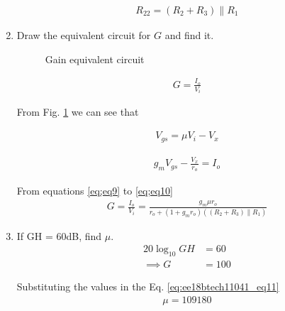 \begin{enumerate}[label=\arabic*.,ref=\theenumi]
\begin{align}
    R_{22} = (R_2+R_3) \parallel R_1
\end{align}

\item Draw the equivalent circuit for $G$ and find it.
\\
\solution 
\begin{figure}[!ht]
	\begin{center}
		\resizebox{\columnwidth}{!}{}
	\end{center}
\caption{Gain equivalent circuit}
\label{fig:ee18btech11041_fig7}
\end{figure}
\begin{align}
    G = \frac{I_o}{V_i} 
    \label{eq;eq8}
\end{align}

From Fig. \ref{fig:ee18btech11041_fig7} we can see that
 
\begin{align}
    V_{gs} = \mu V_i - V_x
    \label{eq;eq9}
\end{align}

\begin{align}
    g_mV_{gs} - \frac{V_x}{r_o} = I_o
    \label{eq;eq10}
\end{align}

From equations \ref{eq;eq9} to \ref{eq;eq10}
\begin{align}
    G = \frac{I_o}{V_i} = \frac{g_m \mu r_o}{r_o + (1+g_m r_o)((R_2+R_3) \parallel R_1) }
    \label{eq:ee18btech11041_eq11}
\end{align}
\item If GH = 60dB, find $\mu$.
\\
\solution 
\begin{align}
    20\log_{10} GH &= 60 
    \label{eq:ee18btech11041_eq12}
\\
\implies G&=100
\end{align}

Substituting the values in the Eq. \ref{eq:ee18btech11041_eq11}
\begin{align}
    \mu = 109180
\end{align}
%
%



\end{enumerate}
